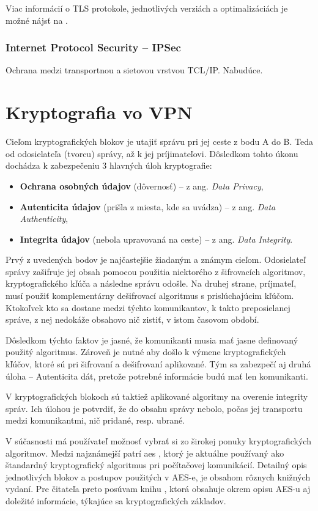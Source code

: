 Viac informácií o TLS protokole, jednotlivých verziách a optimalizáciách je možné nájsť na \cite{tls}. 

\subsection{Internet Protocol Security  -- IPSec}
Ochrana medzi transportnou a sietovou vrstvou TCL/IP.
Nabudúce. \cite{biks}
\chapter{Kryptografia vo VPN}\label{krypto}
Cieľom kryptografických blokov je utajiť správu pri jej ceste z bodu A do B. Teda od odosielateľa (tvorcu) správy, až k jej príjimateľovi. Dôsledkom tohto úkonu dochádza k zabezpečeniu 3 hlavných úloh kryptografie:
\begin{itemize}
	\item \textbf{Ochrana osobných údajov} (dôvernosť) -- z ang. \textit{Data Privacy}, 
	\item \textbf{Autenticita údajov} (prišla z miesta, kde sa uvádza)  -- z ang. \textit{Data Authenticity},
	\item \textbf{Integrita údajov} (nebola upravovaná na ceste)  -- z ang. \textit{Data Integrity}.
\end{itemize}

 Prvý z uvedených bodov je najčastejšie žiadaným a známym cieľom. Odosielateľ správy zašifruje jej obsah pomocou použitia niektorého z šifrovacích algoritmov, kryptografického kľúča a následne správu odošle. Na druhej strane, príjmateľ, musí použiť komplementárny dešifrovací algoritmus s prislúchajúcim kľúčom. Ktokoľvek kto sa dostane medzi týchto komunikantov, k takto preposielanej správe, z nej nedokáže obsahovo nič zistiť, v istom časovom období. 
 
 Dôsledkom týchto faktov je jasné, že komunikanti musia mať jasne definovaný použitý algoritmus. Zároveň je nutné aby došlo k výmene kryptografických kľúčov, ktoré sú pri šifrovaní a dešifrovaní aplikované. Tým sa zabezpečí aj druhá úloha -- Autenticita dát, pretože potrebné informácie budú mať len komunikanti. 
 
 V kryptografických blokoch sú taktiež aplikované algoritmy na overenie integrity správ. Ich úlohou je potvrdiť, že do obsahu správy nebolo, počas jej transportu medzi komunikantmi, nič pridané, resp. ubrané.
 
 V súčasnosti má používateľ možnosť vybrať si zo širokej ponuky kryptografických algoritmov. Medzi najznámejší patrí \acrshort{aes}  \cite{aes}, ktorý je aktuálne používaný ako štandardný kryptografický algoritmus pri počítačovej komunikácií. Detailný opis jednotlivých blokov a postupov použitých v AES-e, je obsahom rôznych knižných vydaní. Pre čitateľa preto posúvam knihu \cite{levicky}, ktorá obsahuje okrem opisu AES-u aj doležité informácie, týkajúce sa kryptografických základov.

